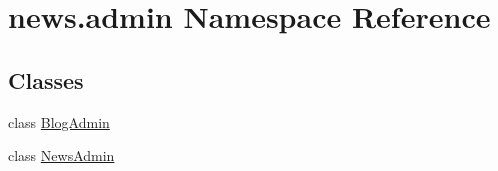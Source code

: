 \hypertarget{namespacenews_1_1admin}{}\section{news.\+admin Namespace Reference}
\label{namespacenews_1_1admin}
\subsection*{Classes}
\begin{DoxyCompactItemize}
\item 
class \mbox{\hyperlink{classnews_1_1admin_1_1_blog_admin}{Blog\+Admin}}
\item 
class \mbox{\hyperlink{classnews_1_1admin_1_1_news_admin}{News\+Admin}}
\end{DoxyCompactItemize}
